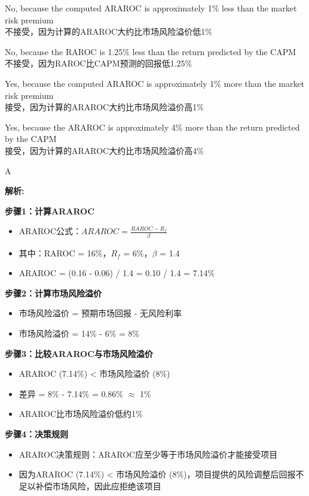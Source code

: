\documentclass{article}
\newenvironment{explanation}
{\textbf{解析:}\par}
{\par}
\begin{document}
\begin{choices}
    \item No, because the computed ARAROC is approximately 1\% less than the market risk premium\\
    不接受，因为计算的ARAROC大约比市场风险溢价低1\%
    \item No, because the RAROC is 1.25\% less than the return predicted by the CAPM\\
    不接受，因为RAROC比CAPM预测的回报低1.25\%
    \item Yes, because the computed ARAROC is approximately 1\% more than the market risk premium\\
    接受，因为计算的ARAROC大约比市场风险溢价高1\%
    \item Yes, because the ARAROC is approximately 4\% more than the return predicted by the CAPM\\
    接受，因为计算的ARAROC大约比市场风险溢价高4\%
\end{choices}

\begin{correctanswer}
    A
\end{correctanswer}

\begin{explanation}
    \textbf{步骤1：计算ARAROC}
    \begin{itemize}
        \item ARAROC公式：$ARAROC = \frac{RAROC - R_f}{\beta}$
        \item 其中：RAROC = 16\%，$R_f$ = 6\%，$\beta$ = 1.4
        \item ARAROC = (0.16 - 0.06) / 1.4 = 0.10 / 1.4 = 7.14\%
    \end{itemize}

    \textbf{步骤2：计算市场风险溢价}
    \begin{itemize}
        \item 市场风险溢价 = 预期市场回报 - 无风险利率
        \item 市场风险溢价 = 14\% - 6\% = 8\%
    \end{itemize}

    \textbf{步骤3：比较ARAROC与市场风险溢价}
    \begin{itemize}
        \item ARAROC (7.14\%) < 市场风险溢价 (8\%)
        \item 差异 = 8\% - 7.14\% = 0.86\% $\approx$ 1\%
        \item ARAROC比市场风险溢价低约1\%
    \end{itemize}

    \textbf{步骤4：决策规则}
    \begin{itemize}
        \item ARAROC决策规则：ARAROC应至少等于市场风险溢价才能接受项目
        \item 因为ARAROC (7.14\%) < 市场风险溢价 (8\%)，项目提供的风险调整后回报不足以补偿市场风险，因此应拒绝该项目
    \end{itemize}

\end{explanation}
\end{document}

